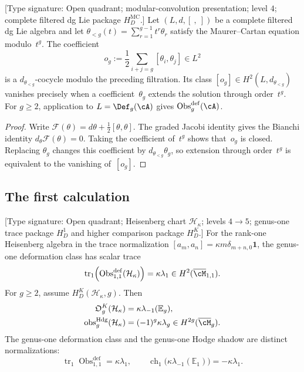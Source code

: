 \begin{theorem}
\label{thm:obstruction-general}
\textup{[Type signature: Open quadrant; modular-convolution
presentation; level $4$; complete filtered dg Lie package
$H_D^{\mathrm{MC}}$.]}
Let $(L,d,[\ ,\ ])$ be a complete filtered dg Lie algebra and let
\(
 \theta_{<g}(t)=\sum_{r=1}^{g-1}t^r\theta_r
\)
satisfy the Maurer--Cartan equation modulo~$t^g$.  The coefficient
\begin{equation}
 o_g
 :=\frac12\sum_{i+j=g}[\theta_i,\theta_j]
 \in L^2
\end{equation}
is a $d_{\theta_{<g}}$-cocycle modulo the preceding filtration.  Its
class $[o_g]\in H^2(L,d_{\theta_{<g}})$ vanishes precisely when a
coefficient~$\theta_g$ extends the solution through order~$t^g$.
For $g\geq2$, application to $L=\Def_g(\cA)$ gives
$\operatorname{Obs}^{\mathrm{def}}_g(\cA)$.
\end{theorem}

\begin{proof}
Write
\(
 \mathcal F(\theta)=d\theta+\frac12[\theta,\theta].
\)
The graded Jacobi identity gives the Bianchi identity
\(
 d_\theta\mathcal F(\theta)=0.
\)
Taking the coefficient of~$t^g$ shows that~$o_g$ is closed.  Replacing
$\theta_g$ changes this coefficient by
$d_{\theta_{<g}}\theta_g$, so extension through order~$t^g$ is
equivalent to the vanishing of~$[o_g]$.
\end{proof}

\subsection{The first calculation}
\label{subsec:heisenberg-obstruction}

\begin{theorem}
\label{thm:heisenberg-obs}
\textup{[Type signature: Open quadrant; Heisenberg chart
$\mathcal H_\kappa$; levels $4\to5$; genus-one trace package
$H_D^1$ and higher comparison package $H_D^K$.]}
For the rank-one Heisenberg algebra in the trace normalization
\([a_m,a_n]=\kappa m\delta_{m+n,0}\mathbf1\), the genus-one
deformation class has scalar trace
\begin{equation}
 \operatorname{tr}_1\!\left(
 \operatorname{Obs}^{\mathrm{def}}_{1,1}(\mathcal H_\kappa)
 \right)
 =\kappa\lambda_1
 \in H^2(\overline{\cM}_{1,1}).
\end{equation}
For $g\ge2$, assume $H_D^K(\mathcal H_\kappa,g)$.  Then
\begin{align}
 \mathfrak O_g^K(\mathcal H_\kappa)
 &=\kappa\lambda_{-1}(\mathbb E_g),\\
 \operatorname{obs}^{\mathrm{Hdg}}_g(\mathcal H_\kappa)
 &=(-1)^g\kappa\lambda_g
 \in H^{2g}(\overline{\cM}_g).
\end{align}
The genus-one deformation class and the genus-one Hodge shadow are
distinct normalizations:
\[
 \operatorname{tr}_1\operatorname{Obs}^{\mathrm{def}}_{1,1}
 =\kappa\lambda_1,
 \qquad
 \operatorname{ch}_1\bigl(\kappa\lambda_{-1}(\mathbb E_1)\bigr)
 =-\kappa\lambda_1.
\]
\end{theorem}

